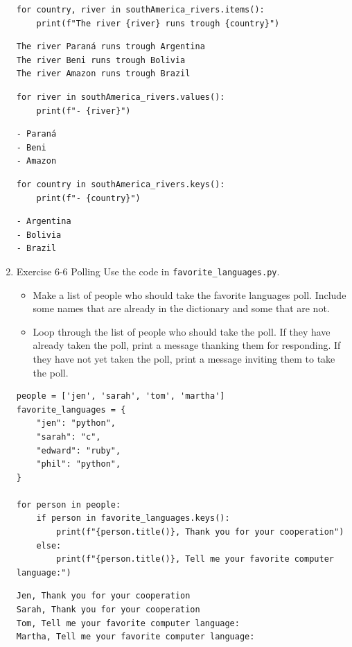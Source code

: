 \documentclass[10pt]{book}
\begin{document}
\begin{enumerate}
\label{org7baf589}
\begin{verbatim}
for country, river in southAmerica_rivers.items():
    print(f"The river {river} runs trough {country}")
\end{verbatim}

\label{orgae9191e}
\begin{verbatim}
The river Paraná runs trough Argentina
The river Beni runs trough Bolivia
The river Amazon runs trough Brazil
\end{verbatim}

\label{org1db64b8}
\begin{verbatim}
for river in southAmerica_rivers.values():
    print(f"- {river}")
\end{verbatim}

\label{org96d101e}
\begin{verbatim}
- Paraná
- Beni
- Amazon
\end{verbatim}

\label{orgb47f3c9}
\begin{verbatim}
for country in southAmerica_rivers.keys():
    print(f"- {country}")
\end{verbatim}

\label{orge1778c1}
\begin{verbatim}
- Argentina
- Bolivia
- Brazil
\end{verbatim}
\item Exercise 6-6 Polling
\label{sec:org404c52a}
Use the code in \texttt{favorite\_languages.py}.
\begin{itemize}
\item Make a list of people who should take the favorite languages poll. Include some names that are already in the dictionary and some that are not.
\item Loop through the list of people who should take the poll. If they have already taken the poll, print a message thanking them for responding. If they have not yet taken the poll, print a message inviting them to take the poll.
\end{itemize}
\begin{verbatim}
people = ['jen', 'sarah', 'tom', 'martha']
favorite_languages = {
    "jen": "python",
    "sarah": "c",
    "edward": "ruby",
    "phil": "python",
}

for person in people:
    if person in favorite_languages.keys():
        print(f"{person.title()}, Thank you for your cooperation")
    else:
        print(f"{person.title()}, Tell me your favorite computer language:")
\end{verbatim}

\label{org3145e31}
\begin{verbatim}
Jen, Thank you for your cooperation
Sarah, Thank you for your cooperation
Tom, Tell me your favorite computer language:
Martha, Tell me your favorite computer language:
\end{verbatim}
\end{enumerate}
\end{document}
